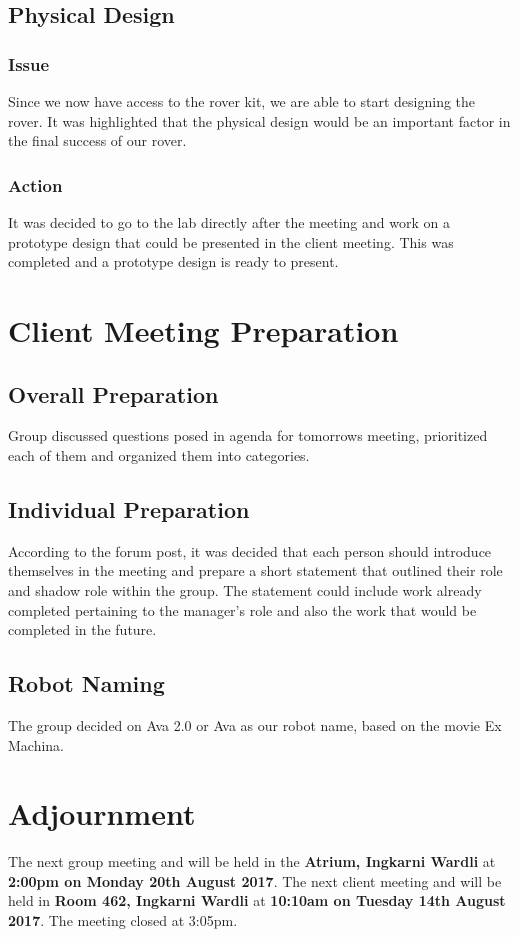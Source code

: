 \documentclass{article}
\begin{document}
     \subsection{Physical Design}
		\subsubsection*{Issue}
		Since we now have access to the rover kit, we are able to start designing the rover. It was highlighted that the physical design would be an important factor in the final success of our rover.
    	\subsubsection*{Action}
    	It was decided to go to the lab directly after the meeting and work on a prototype design that could be presented in the client meeting. This was completed and a prototype design is ready to present.

\section{Client Meeting Preparation}
\subsection{Overall Preparation}
Group discussed questions posed in agenda for tomorrows meeting, prioritized each of them and organized them into categories.
\subsection{Individual Preparation}
According to the forum post, it was decided that each person should introduce themselves in the meeting and prepare a short statement that outlined their role and shadow role within the group. 
The statement could include work already completed pertaining to the manager's role and also the work that would be completed in the future.
\subsection{Robot Naming}
The group decided on Ava 2.0 or Ava as our robot name, based on the movie Ex Machina.
\section{Adjournment}
	The next group meeting and will be held in the {\bf Atrium, Ingkarni Wardli} at {\bf 2:00pm on Monday 20th August 2017}.\newline
    The next client meeting and will be held in {\bf Room 462, Ingkarni Wardli} at {\bf 10:10am on Tuesday 14th August 2017}.\newline
The meeting closed at 3:05pm.
\end{document}
